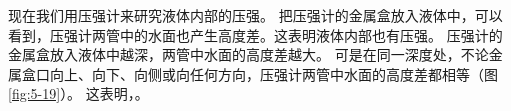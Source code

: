 现在我们用压强计来研究液体内部的压强。
把压强计的金属盒放入液体中，可以看到，压强计两管中的水面也产生高度差。这表明液体内部也有压强。
压强计的金属盒放入液体中越深，两管中水面的高度差越大。
可是在同一深度处，不论金属盒口向上、向下、向侧或向任何方向，压强计两管中水面的高度差都相等（图 \ref{fig:5-19}）。
这表明，。




